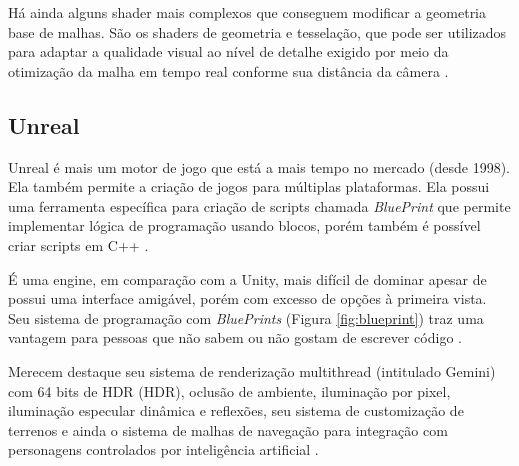 Há ainda alguns shader mais complexos que conseguem modificar a geometria base de malhas. São os shaders de geometria e tesselação, que pode ser utilizados para adaptar a qualidade visual ao nível de detalhe exigido por meio da otimização da malha em tempo real conforme sua distância da câmera \cite{aino2020}.

\subsection{Unreal}
\label{sec:unreal}

Unreal é mais um motor de jogo que está a mais tempo no mercado (desde 1998). Ela também permite a criação de jogos para múltiplas plataformas. Ela possui uma ferramenta específica para criação de scripts chamada \textit{BluePrint} que permite implementar lógica de programação usando blocos, porém também é possível criar scripts em C++ \cite{compStudyGE}.

\begin{figure}[h!]
	\centering
\end{figure}
\nocite{blueprint}

É uma engine, em comparação com a Unity, mais difícil de dominar apesar de possui uma interface amigável, porém com excesso de opções à primeira vista. Seu sistema de programação com \textit{BluePrints} (Figura \ref{fig:blueprint}) traz uma vantagem para pessoas que não sabem ou não gostam de escrever código \cite{compStudyGE}.

Merecem destaque seu sistema de renderização \Gls{multithread} (intitulado Gemini) com 64 bits de HDR (\acrlong{HDR}), oclusão de ambiente, iluminação por pixel, iluminação especular dinâmica e reflexões, seu sistema de customização de terrenos e ainda o sistema de malhas de navegação para integração com personagens controlados por inteligência artificial \cite{armstrong2013game}.

